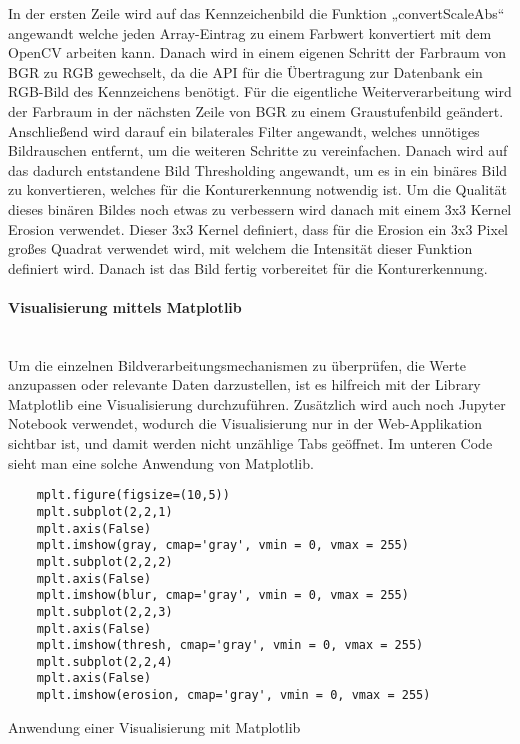 In der ersten Zeile wird auf das Kennzeichenbild die Funktion „convertScaleAbs“ angewandt welche jeden Array-Eintrag zu einem Farbwert konvertiert mit dem 
OpenCV arbeiten kann. Danach wird in einem eigenen Schritt der Farbraum von BGR zu RGB gewechselt, da die API für die Übertragung zur Datenbank ein RGB-Bild 
des Kennzeichens benötigt. Für die eigentliche Weiterverarbeitung wird der Farbraum in der nächsten Zeile von BGR zu einem Graustufenbild geändert. 
Anschließend wird darauf ein bilaterales Filter angewandt, welches unnötiges Bildrauschen entfernt, um die weiteren Schritte zu vereinfachen. Danach 
wird auf das dadurch entstandene Bild Thresholding angewandt, um es in ein binäres Bild zu konvertieren, welches für die Konturerkennung notwendig ist. 
Um die Qualität dieses binären Bildes noch etwas zu verbessern wird danach mit einem 3x3 Kernel Erosion verwendet. Dieser 3x3 Kernel definiert, dass für die Erosion ein 3x3 Pixel großes Quadrat verwendet wird, mit welchem die Intensität dieser Funktion definiert wird. 
Danach ist das Bild fertig vorbereitet für die Konturerkennung.

\paragraph{Visualisierung mittels Matplotlib}\mbox{}\\

Um die einzelnen Bildverarbeitungsmechanismen zu überprüfen, die Werte anzupassen oder relevante Daten darzustellen, ist es hilfreich mit der Library 
Matplotlib eine Visualisierung durchzuführen. Zusätzlich wird auch noch Jupyter Notebook verwendet, wodurch die Visualisierung nur in der Web-Applikation 
sichtbar ist, und damit werden nicht unzählige Tabs geöffnet. Im unteren Code sieht man eine solche Anwendung von Matplotlib.

\begin{listing}[H]
    \begin{verbatim}
    mplt.figure(figsize=(10,5))
    mplt.subplot(2,2,1)
    mplt.axis(False)
    mplt.imshow(gray, cmap='gray', vmin = 0, vmax = 255) 
    mplt.subplot(2,2,2)
    mplt.axis(False)
    mplt.imshow(blur, cmap='gray', vmin = 0, vmax = 255)
    mplt.subplot(2,2,3)
    mplt.axis(False)
    mplt.imshow(thresh, cmap='gray', vmin = 0, vmax = 255)
    mplt.subplot(2,2,4)
    mplt.axis(False)
    mplt.imshow(erosion, cmap='gray', vmin = 0, vmax = 255)
    \end{verbatim}
    \caption{Anwendung einer Visualisierung mit Matplotlib}
\end{listing}

